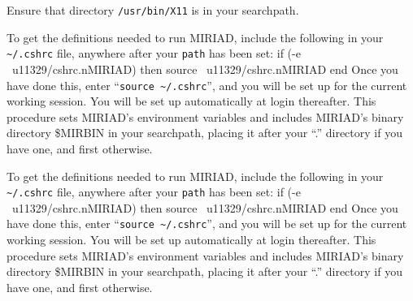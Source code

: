 
Ensure that directory {\tt /usr/bin/X11} is in your searchpath.

To get the definitions needed to run MIRIAD, include the following in your
{\tt \~\//.cshrc} file, anywhere after your {\tt path} has been set:
{\ninepoint\begintt
    if (-e ~u11329/cshrc.nMIRIAD) then
       source ~u11329/cshrc.nMIRIAD
    end
\endtt}
Once you have done this, enter ``{\tt source \~\//.cshrc}'', and you will be
set up for the current working session.  You will be set up automatically
at login thereafter.  This procedure sets MIRIAD's environment variables
and includes MIRIAD's binary directory \$MIRBIN in your searchpath, placing
it after your ``.'' directory if you have one, and first otherwise.


To get the definitions needed to run MIRIAD, include the following in your
{\tt \~\//.cshrc} file, anywhere after your {\tt path} has been set:
{\ninepoint\begintt
    if (-e ~u11329/cshrc.nMIRIAD) then
       source ~u11329/cshrc.nMIRIAD
    end
\endtt}
Once you have done this, enter ``{\tt source \~\//.cshrc}'', and you will be
set up for the current working session.  You will be set up automatically
at login thereafter.  This procedure sets MIRIAD's environment variables
and includes MIRIAD's binary directory \$MIRBIN in your searchpath, placing
it after your ``.'' directory if you have one, and first otherwise.
